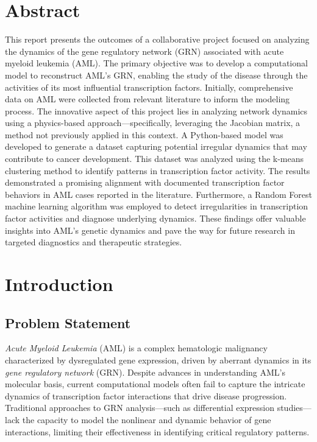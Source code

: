 \documentclass[a4paper,12pt]{article}
\begin{document}
\section*{Abstract}
This report presents the outcomes of a collaborative project focused on analyzing the dynamics of the gene regulatory network (GRN) associated with acute myeloid leukemia (AML). The primary objective was to develop a computational model to reconstruct AML’s GRN, enabling the study of the disease through the activities of its most influential transcription factors.
Initially, comprehensive data on AML were collected from relevant literature to inform the modeling process. The innovative aspect of this project lies in analyzing network dynamics using a physics-based approach—specifically, leveraging the Jacobian matrix, a method not previously applied in this context.
A Python-based model was developed to generate a dataset capturing potential irregular dynamics that may contribute to cancer development. This dataset was analyzed using the k-means clustering method to identify patterns in transcription factor activity. The results demonstrated a promising alignment with documented transcription factor behaviors in AML cases reported in the literature.
Furthermore, a Random Forest machine learning algorithm was employed to detect irregularities in transcription factor activities and diagnose underlying dynamics. These findings offer valuable insights into AML’s genetic dynamics and pave the way for future research in targeted diagnostics and therapeutic strategies.


\section{Introduction}
\subsection{Problem Statement}
\textit{Acute Myeloid Leukemia} (AML) is a complex hematologic malignancy characterized by dysregulated gene expression, driven by aberrant dynamics in its \textit{gene regulatory network} (GRN). Despite advances in understanding AML’s molecular basis, current computational models often fail to capture the intricate dynamics of transcription factor interactions that drive disease progression. Traditional approaches to GRN analysis—such as differential expression studies—lack the capacity to model the nonlinear and dynamic behavior of gene interactions, limiting their effectiveness in identifying critical regulatory patterns.
\end{document}
